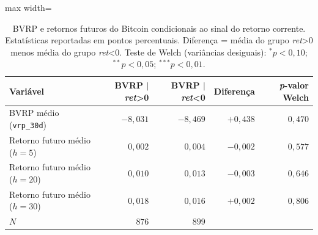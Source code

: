 ﻿%
\begin{table}[htbp]
  \centering
  \caption{BVRP e retornos futuros do Bitcoin condicionais ao sinal do retorno
    corrente. Estatísticas reportadas em pontos percentuais.
    Diferença = média do grupo \textit{ret}>0 menos média do grupo \textit{ret}<0.
    Teste de Welch (variâncias desiguais): $^{*}p<0{,}10$; $^{**}p<0{,}05$; $^{***}p<0{,}01$.}
  \label{tab:retnl-sinal-retorno}
  \begin{adjustbox}{max width=\textwidth}
\begin{tabular}{lrrrr}
    \toprule
    \textbf{Variável} & \textbf{BVRP $|$ \textit{ret}>0} & \textbf{BVRP $|$ \textit{ret}<0} & \textbf{Diferença} & \textbf{\textit{p}-valor Welch} \\
    \midrule
    BVRP médio (\texttt{vrp\_30d}) & $-8,031$ & $-8,469$ & $+0,438$ & $0,470$ \\
    \midrule
    Retorno futuro médio ($h=5$) & $0,002$ & $0,004$ & $-0,002$ & $0,577$ \\
    Retorno futuro médio ($h=20$) & $0,010$ & $0,013$ & $-0,003$ & $0,646$ \\
    Retorno futuro médio ($h=30$) & $0,018$ & $0,016$ & $+0,002$ & $0,806$ \\
    \midrule
    $N$ & $876$ & $899$ & & \\
    \bottomrule
  \end{tabular}
\end{adjustbox}
\end{table}

